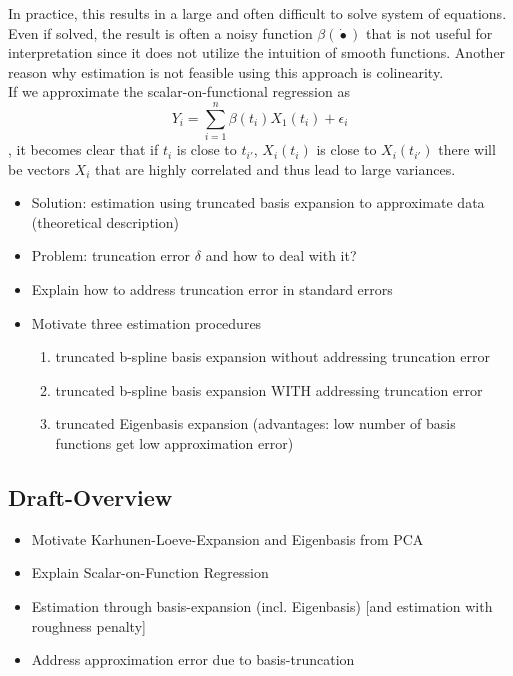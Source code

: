 \documentclass[11pt,twoside,a4paper]{article}
\begin{document}
   In practice, this results in a large and often difficult to solve system of equations. Even if solved, the result is often a noisy function $\beta(\dot{•})$ that is not useful for interpretation since it does not utilize the intuition of smooth functions. Another reason why estimation is not feasible using this approach is colinearity. \\
   
   If we approximate the scalar-on-functional regression as
  	\begin{equation}
     Y_i = \sum_{i = 1}^{n} \beta(t_{i})X_1(t_{i}) + \epsilon_{i}
    \end{equation}, it becomes clear that if $t_{i}$ is close to $t_{i'}$, $X_{i}(t_{i})$ is close to $X_{i}(t_{i'})$ there will be vectors $X_{i}$ that are highly correlated and thus lead to large variances.
   
    
	
	\begin{itemize}
		\item Solution: estimation using truncated basis expansion to approximate data (theoretical description)
		\item Problem: truncation error $\delta$ and how to deal with it?
		\item Explain how to address truncation error in standard errors
		\item Motivate three estimation procedures
		\begin{enumerate}
			\item truncated b-spline basis expansion without addressing truncation error
			\item truncated b-spline basis expansion WITH addressing truncation error
			\item truncated Eigenbasis expansion (advantages: low number of basis functions get low approximation error)
		\end{enumerate}
	\end{itemize}
	
	\subsection{Draft-Overview}
	\begin{itemize}
		\item Motivate Karhunen-Loeve-Expansion and Eigenbasis from PCA		
		\item Explain Scalar-on-Function Regression
		\item Estimation through basis-expansion (incl. Eigenbasis) [and estimation with roughness penalty]
		\item Address approximation error due to basis-truncation
	\end{itemize}
\end{document}
